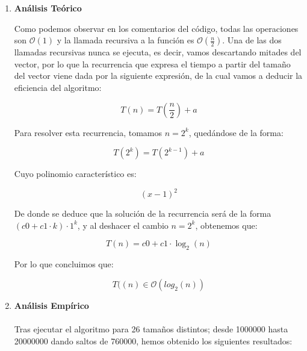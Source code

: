 \documentclass[10pt,a4paper]{article}
\begin{document}
\begin{enumerate}
 \item \textbf{Análisis Teórico}
 
 
 
 Como podemos observar en los comentarios del código, todas las operaciones son \(\mathcal{O}(1)\) y la llamada recursiva a la función es \(\mathcal{O}\left(\frac{n}{2}\right)\). Una de las dos llamadas recursivas nunca se ejecuta, es decir, vamos descartando mitades del vector, por lo que la recurrencia que expresa el tiempo a partir del tamaño del vector viene dada por la siguiente expresión, de la cual vamos a deducir la eficiencia del algoritmo:
 
 \[
 T(n) = T\left(\frac{n}{2}\right) + a
 \]
 
 Para resolver esta recurrencia, tomamos $n = 2^k$, quedándose de la forma:
 
  \[
 T(2^k) = T(2^{k-1}) + a
 \]
 
 Cuyo polinomio característico es:
 
 \[
 (x-1)^2
 \]
 
 De donde se deduce que la solución de la recurrencia será de la forma $(c0 + c1 \cdot k) \cdot 1^k$, y al deshacer el cambio $n = 2^k$, obtenemos que:
 
 \[
 T(n) = c0 + c1 \cdot \log_{2}(n)
 \]
 
 Por lo que concluimos que:
 
 \[
 	T((n) \in \mathcal{O}(log_{2}(n))
 \]
 
 \item \textbf{Análisis Empírico}\\
 \\
 Tras ejecutar el algoritmo para 26 tamaños distintos; desde 1000000 hasta 20000000 dando saltos de 760000, hemos obtenido los siguientes resultados:
 
 \newpage
 
 \begin{table}[h!]
 	\centering
 	\footnotesize
 	\caption{Experiencia empírica de la búsqueda binaria}
 \end{table}
 

\end{enumerate}
\end{document}

